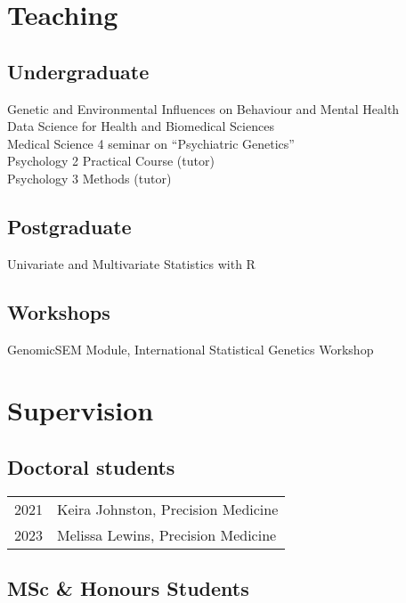 \documentclass[11pt]{article}
\begin{document}
\section*{Teaching}

\subsection*{Undergraduate}

Genetic and Environmental Influences on Behaviour and Mental Health \\
Data Science for Health and Biomedical Sciences \\
Medical Science 4 seminar on ``Psychiatric Genetics'' \\ 
Psychology 2 Practical Course (tutor) \\
Psychology 3 Methods (tutor)

\subsection*{Postgraduate}

Univariate and Multivariate Statistics with R 

\subsection*{Workshops}

GenomicSEM Module, International Statistical Genetics Workshop

\section*{Supervision}

\subsection*{Doctoral students}

\begin{tabular}{p{3cm}p{12cm}}

2021 & Keira Johnston, Precision Medicine \\
2023 & Melissa Lewins, Precision Medicine

\end{tabular}

\subsection*{MSc \& Honours Students}
\end{document}
